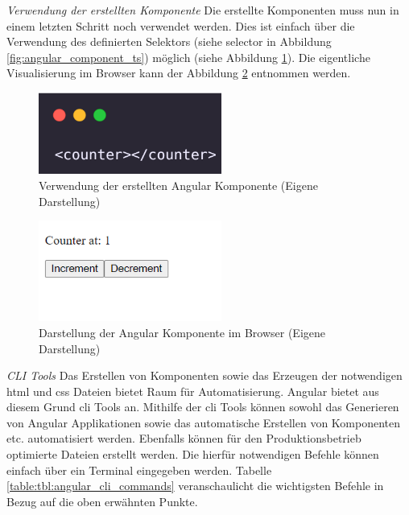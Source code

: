 \noindent
\textit{Verwendung der erstellten Komponente}
\newline
\indent
Die erstellte Komponenten muss nun in einem letzten Schritt noch verwendet werden. Dies ist einfach über die Verwendung des definierten Selektors (siehe selector in  Abbildung \ref{fig:angular_component_ts}) möglich (siehe Abbildung \ref{fig:angular_component_usage}). Die eigentliche Visualisierung im Browser kann der Abbildung \ref{fig:angular_component_browser} entnommen werden.

\begin{figure}[h]
    \includegraphics[width=6cm]{images/angular_component_usage.png}
    \centering
    \caption{Verwendung der erstellten Angular Komponente (Eigene Darstellung)}
    \label{fig:angular_component_usage}
\end{figure}

\begin{figure}[h]
    \includegraphics[width=6cm]{images/angular_component_browser.png}
    \centering
    \caption{Darstellung der Angular Komponente im Browser (Eigene Darstellung)}
    \label{fig:angular_component_browser}
\end{figure}

\noindent
\textit{CLI Tools}
\newline
\indent
Das Erstellen von Komponenten sowie das Erzeugen der notwendigen \gls{html} und \gls{css} Dateien bietet Raum für Automatisierung. Angular bietet aus diesem Grund \gls{cli} Tools an. Mithilfe der \gls{cli} Tools können sowohl das Generieren von Angular Applikationen sowie das automatische Erstellen von Komponenten etc. automatisiert werden. Ebenfalls können für den Produktionsbetrieb optimierte Dateien erstellt werden. Die hierfür notwendigen Befehle können einfach über ein Terminal eingegeben werden. Tabelle \ref{table:tbl:angular_cli_commands} veranschaulicht die wichtigsten Befehle in Bezug auf die oben erwähnten Punkte.

